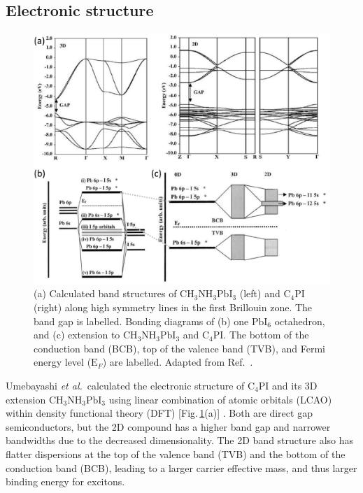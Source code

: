 \subsection{Electronic structure}
\begin{figure}[h!]
\centering
\includegraphics[width=\textwidth]{Fig12}
\caption{(a) Calculated band structures of $\textrm{CH}_3\textrm{NH}_3\textrm{PbI}_3$ (left) and $\textrm{C}_{4}$PI (right) along high symmetry lines in the first Brillouin zone. The band gap is labelled. Bonding diagrams of (b) one $\textrm{PbI}_6$ octahedron, and (c) extension to $\textrm{CH}_3\textrm{NH}_3\textrm{PbI}_3$ and $\textrm{C}_{4}$PI. The bottom of the conduction band (BCB), top of the valence band (TVB), and Fermi energy level ($\textrm{E}_F$) are labelled. Adapted from Ref.\ \cite{Umebayashi2003}.}
\label{2Fig12}
\end{figure}
Umebayashi \textit{et al.}\ calculated the electronic structure of $\textrm{C}_{4}$PI and its 3D extension $\textrm{CH}_3\textrm{NH}_3\textrm{PbI}_3$ using linear combination of atomic orbitals (LCAO) within density functional theory (DFT) [Fig.\,\ref{2Fig12}(a)] \cite{Umebayashi2003}. Both are direct gap semiconductors, but the 2D compound has a higher band gap and narrower bandwidths due to the decreased dimensionality. The 2D band structure also has flatter dispersions at the top of the valence band (TVB) and the bottom of the conduction band (BCB), leading to a larger carrier effective mass, and thus larger binding energy for excitons. 

